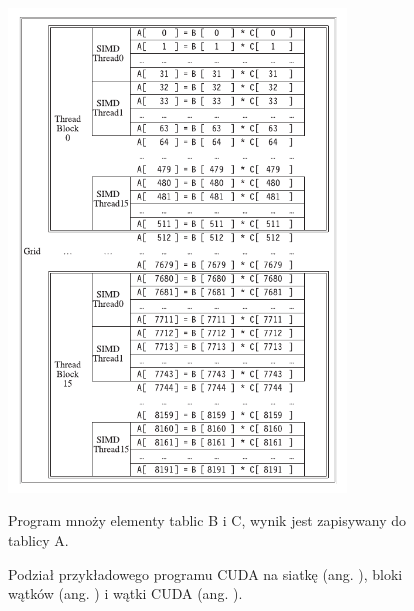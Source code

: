 \begin{figure}
      \centering
      \includegraphics[width=0.8\textwidth]{graf/CUDA-Grid.png}
      \caption {
            Podział przykładowego programu CUDA na siatkę (ang. ),
            bloki wątków (ang. ) i wątki CUDA (ang. ).
            \cite{computer-arch}
      }
      \medskip \small
      Program mnoży elementy tablic B i C, wynik jest zapisywany do tablicy A.
      \label{fig:cuda-grid}
\end{figure}


